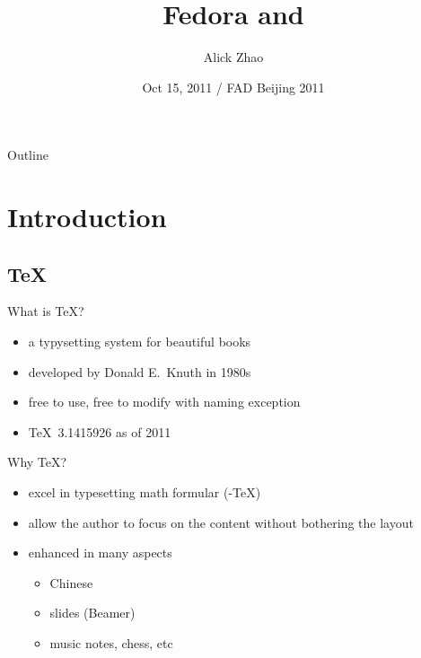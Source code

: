 \documentclass{beamer}
\title %
{Fedora and \TL}
\author[alick] %
{Alick Zhao\inst{1}}
\institute[Tsinghua University] %
{
  \texttt{alick9188@gmail.com}\\
  Department of Electronic Engineering\\
  Tsinghua University
}
\date[FAD Beijing 2011] %
{Oct 15, 2011 / FAD Beijing 2011}
\begin{document}
\begin{frame}
  \titlepage
\end{frame}

\begin{frame}{Outline}
  \tableofcontents
\end{frame}




\section{Introduction}

\subsection{\TeX}

\begin{frame}{What is \TeX ?}

  \begin{itemize}
    \item a typysetting system for beautiful books
    \item developed by Donald E.~Knuth in 1980s
    \item free to use, free to modify with naming exception
    \item \TeX\ 3.1415926 as of 2011
  \end{itemize}
\end{frame}

\begin{frame}{Why \TeX ?}
  \begin{itemize}
    \item excel in typesetting math formular (\AmS-\TeX{})
    \item allow the author to focus on the content without bothering the
      layout
    \item enhanced in many aspects
      \begin{itemize}
        \item Chinese
        \item slides (Beamer)
        \item music notes, chess, etc
      \end{itemize}
  \end{itemize}
\end{frame}
\end{document}
